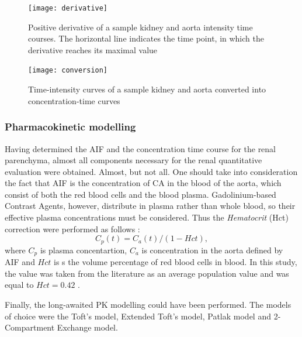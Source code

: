 \begin{figure}[H]
	\centering
	\texttt{[image: derivative]}
\caption[Positive derivative of the sample kidney and aorta intensity time courses]{Positive derivative of a sample kidney and aorta intensity time courses. The horizontal line indicates the time point, in which the derivative reaches its maximal value}
\label{fig:derivative}
\end{figure}

\begin{figure}[H]
	\centering
	\texttt{[image: conversion]}
\caption[Time courses of a sample kidney and aorta after intensity-concentration conversion]{Time-intensity curves of a sample kidney and aorta converted into concentration-time curves}
\label{fig:conversion}
\end{figure}


\subsubsection{Pharmacokinetic modelling}

Having determined the AIF and the concentration time course for the renal parenchyma, almost all components necessary for the renal  quantitative evaluation were obtained. Almost, but not all. One should take into consideration the fact that AIF is the concentration of CA in the blood of the aorta, which consist of both the red blood cells and the blood plasma. Gadolinium-based Contrast Agents, however, distribute in plasma rather than whole blood, so their effective plasma concentrations must be considered. Thus the \textit{Hematocrit} (Hct) correction were performed as follows \cite{tofts2010t1}:
\begin{equation}
	\label{eq:hematocrit}
	C_{p}(t) = C_{a}(t) / (1-Hct),
\end{equation}
where $C_p$ is plasma concentartion, $C_a$ is concentration in the aorta defined by AIF and $Hct$ is s the volume percentage of red blood cells in blood. In this study, the value was taken from the literature as an average population value and was equal to $Hct=0.42$ \cite{tofts2010t1}.

Finally, the long-awaited PK modelling could have been performed. The models of choice were the Toft's model, Extended Toft's model, Patlak model and 2-Compartment Exchange model. 
 
